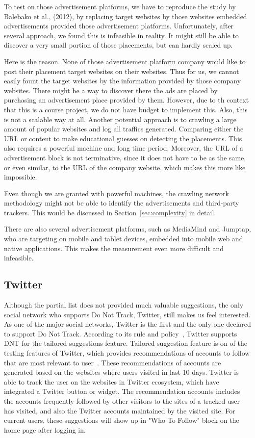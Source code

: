 \documentclass{sig-alternate}
\begin{document}
To test on those advertisement platforms, we have to reproduce the study by Balebako et al., (2012), by replacing target websites by those websites embedded advertisements provided those advertisement platforms. Unfortunately, after several approach, we found this is infeasible in reality. It might still be able to discover a very small portion of those placements, but can hardly scaled up.

Here is the reason. None of those advertisement platform company would like to post their placement target websites on their websites. Thus for us, we cannot easily fount the target websites by the information provided by those company websites. There might be a way to discover there the ads are placed by purchasing an advertisement place provided by them. However, due to th context that this is a course project, we do not have budget to implement this. Also, this is not a scalable way at all. Another potential approach is to crawling a large amount of popular websites and log all traffics generated. Comparing either the URL or content to make educational guesses on detecting the placements. This also requires a powerful machine and long time period. Moreover, the URL of a advertisement block is not terminative, since it does not have to be as the same, or even similar, to the URL of the company website, which makes this more like impossible.

Even though we are granted with powerful machines, the crawling network methodology might not be able to identify the advertisements and third-party trackers. This would be discussed in Section~\ref{sec:complexity} in detail.

There are also several advertisement platforms, such as MediaMind and Jumptap, who are targeting on mobile and tablet devices, embedded into mobile web and native applications. This makes the measurement even more difficult and infeasible.

\subsection{Twitter}

Although the partial list does not provided much valuable suggestions, the only social network who supports Do Not Track, Twitter, still makes us feel interested. As one of the major social networks, Twitter is the first and the only one declared to support Do Not Track. According to its rule and policy~\cite{twitterdnt}, Twitter supports DNT for the tailored suggestions feature. Tailored suggestion feature is on of the testing features of Twitter, which provides recommendations of accounts to follow that are most relevant to user~\cite{twitterfaq}. These recommendations of accounts are generated based on the websites where users visited in last 10 days. Twitter is able to track the user on the websites in Twitter ecosystem, which have integrated a Twitter button or widget. The recommendation accounts includes the accounts frequently followed by other visitors to the sites of a tracked user has visited, and also the Twitter accounts maintained by the visited site. For current users, these suggestions will show up in "Who To Follow" block on the home page after logging in.
\end{document}
